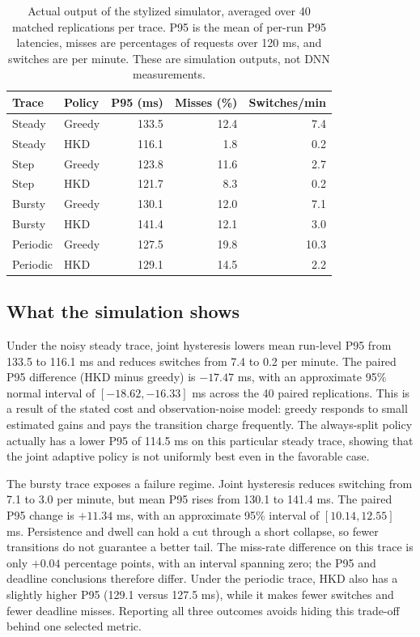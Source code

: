 \documentclass[10pt,a4paper,twocolumn]{article}
\begin{document}
\begin{table}[t]
\centering\small
\caption{Actual output of the stylized simulator, averaged over 40 matched replications per trace. P95 is the mean of per-run P95 latencies, misses are percentages of requests over 120 ms, and switches are per minute. These are simulation outputs, not DNN measurements.}
\label{tab:simulation}
\begin{tabular}{@{}llrrr@{}}\toprule
Trace & Policy & P95 (ms) & Misses (\%) & Switches/min\\\midrule
Steady & Greedy & 133.5 & 12.4 & 7.4\\
Steady & HKD & 116.1 & 1.8 & 0.2\\
Step & Greedy & 123.8 & 11.6 & 2.7\\
Step & HKD & 121.7 & 8.3 & 0.2\\
Bursty & Greedy & 130.1 & 12.0 & 7.1\\
Bursty & HKD & 141.4 & 12.1 & 3.0\\
Periodic & Greedy & 127.5 & 19.8 & 10.3\\
Periodic & HKD & 129.1 & 14.5 & 2.2\\\bottomrule
\end{tabular}
\end{table}

\subsection{What the simulation shows}
Under the noisy steady trace, joint hysteresis lowers mean run-level P95 from 133.5 to 116.1 ms and reduces switches from 7.4 to 0.2 per minute. The paired P95 difference (HKD minus greedy) is $-17.47$ ms, with an approximate 95\% normal interval of $[-18.62,-16.33]$ ms across the 40 paired replications. This is a result of the stated cost and observation-noise model: greedy responds to small estimated gains and pays the transition charge frequently. The always-split policy actually has a lower P95 of 114.5 ms on this particular steady trace, showing that the joint adaptive policy is not uniformly best even in the favorable case.

The bursty trace exposes a failure regime. Joint hysteresis reduces switching from 7.1 to 3.0 per minute, but mean P95 rises from 130.1 to 141.4 ms. The paired P95 change is $+11.34$ ms, with an approximate 95\% interval of $[10.14,12.55]$ ms. Persistence and dwell can hold a cut through a short collapse, so fewer transitions do not guarantee a better tail. The miss-rate difference on this trace is only $+0.04$ percentage points, with an interval spanning zero; the P95 and deadline conclusions therefore differ. Under the periodic trace, HKD also has a slightly higher P95 (129.1 versus 127.5 ms), while it makes fewer switches and fewer deadline misses. Reporting all three outcomes avoids hiding this trade-off behind one selected metric.
\end{document}
